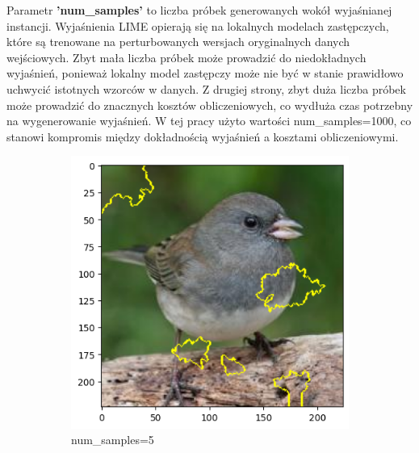 Parametr \textbf{'num\_samples'} to liczba próbek generowanych wokół wyjaśnianej instancji.
Wyjaśnienia LIME opierają się na lokalnych modelach zastępczych, które są trenowane na perturbowanych wersjach oryginalnych danych wejściowych.
Zbyt mała liczba próbek może prowadzić do niedokładnych wyjaśnień, ponieważ lokalny model zastępczy może nie być w stanie prawidłowo uchwycić istotnych wzorców w danych.
Z drugiej strony, zbyt duża liczba próbek może prowadzić do znacznych kosztów obliczeniowych, co wydłuża czas potrzebny na wygenerowanie wyjaśnień.
W tej pracy użyto wartości num\_samples=1000, co stanowi kompromis między dokładnością wyjaśnień a kosztami obliczeniowymi.

\begin{figure}[h]
	\centering
	\begin{subfigure}[b]{0.3\textwidth}
		\includegraphics[width=.9\textwidth]{img/parameters/lime/num_samples_5}
		\caption{num\_samples=5}  \label{rys:parameters_lime_numsamples_5}
	\end{subfigure}
	\begin{subfigure}[b]{0.3\textwidth}

\end{subfigure}
\end{figure}
